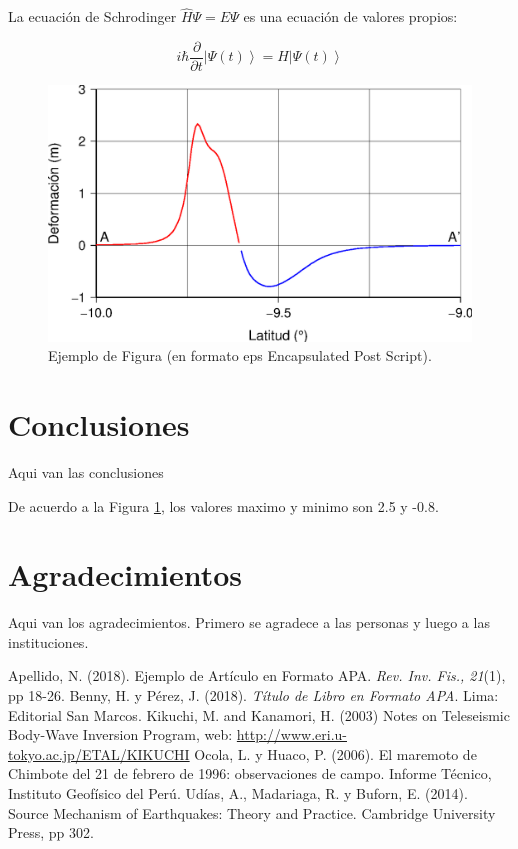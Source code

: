 \documentclass[a4paper,11pt]{article}
\begin{document}
La ecuación de Schrodinger $\hat {H} \Psi = E \Psi $ es una ecuación de
valores propios:

\begin{equation}
i\hbar\frac{\partial}{\partial t}\left|\Psi(t)\right>=H\left|\Psi(t)\right>
\end{equation}

\begin{figure}
\centerline{\includegraphics[scale=0.64]{figura.eps}}
\caption{Ejemplo de Figura (en formato eps Encapsulated Post Script).}
\label{figura1}
\end{figure}

\section{Conclusiones}
Aqui van las conclusiones

De acuerdo a la Figura \ref{figura1}, los valores maximo y minimo son 2.5 y -0.8.

\section*{Agradecimientos}
Aqui van los agradecimientos. Primero se agradece a las personas y luego a las instituciones.


\begin{thebibliography}{99}
 Apellido, N. (2018). Ejemplo de Artículo en Formato APA. \emph{Rev. Inv. Fis., 21}(1), pp 18-26.
 Benny, H. y Pérez, J. (2018). \emph{Título de Libro en Formato APA}. Lima: Editorial San Marcos.
 Kikuchi, M. and Kanamori, H. (2003) Notes on Teleseismic Body-Wave Inversion Program, web: \url{http://www.eri.u-tokyo.ac.jp/ETAL/KIKUCHI}
 Ocola, L. y Huaco, P. (2006). El maremoto de Chimbote del 21 de febrero de 1996: observaciones de campo. Informe Técnico, Instituto Geofísico del Perú.
 Udías, A., Madariaga, R. y Buforn, E. (2014). Source Mechanism of Earthquakes: Theory and Practice. Cambridge University Press, pp 302.

\end{thebibliography}
\end{document}
